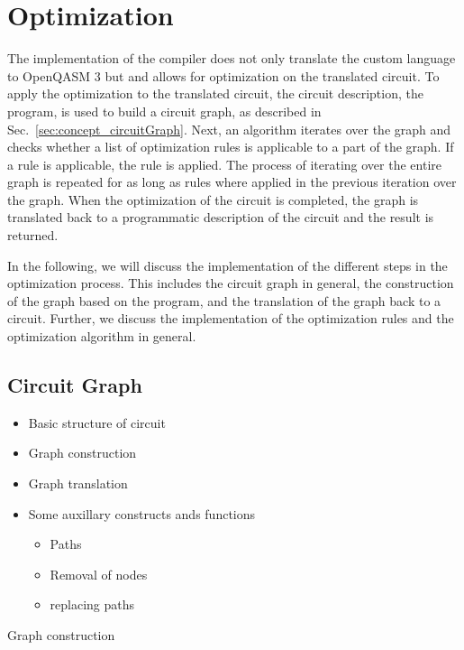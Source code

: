 \section{Optimization}
The implementation of the compiler does not only translate the custom language to OpenQASM 3 but
and allows for optimization on the translated circuit. 
To apply the optimization to the translated circuit, the circuit description, \ie the program, is used to build a circuit graph, as described in Sec.~\ref{sec:concept_circuitGraph}. Next, an algorithm iterates over the graph and checks whether a list of optimization rules is applicable to a part of the graph. If a rule is applicable, the rule is applied. The process of iterating over the entire graph is repeated for as long as rules where applied in the previous iteration over the graph. When the optimization of the circuit is completed, the graph is translated back to a programmatic description of the circuit and the result is returned.

In the following, we will discuss the implementation of the different steps in the optimization process. This includes the circuit graph in general, the construction of the graph based on the program, and the translation of the graph back to a circuit. Further, we discuss the implementation of the optimization rules and the optimization algorithm in  general.

\subsection{Circuit Graph}
\begin{itemize}
    \item Basic structure of circuit
    \item Graph construction
    \item Graph translation
    \item Some auxillary constructs ands functions
    \begin{itemize}
        \item Paths
        \item Removal of nodes
        \item replacing paths
    \end{itemize} 
\end{itemize}

Graph construction

